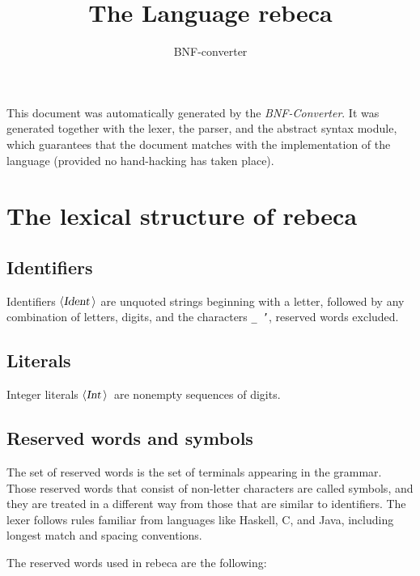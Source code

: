 \documentclass[a4paper,11pt]{article}
\author{BNF-converter}
\title{The Language rebeca}
\begin{document}
\maketitle

\newcommand{\emptyP}{\mbox{$\epsilon$}}
\newcommand{\terminal}[1]{\mbox{{\texttt {#1}}}}
\newcommand{\nonterminal}[1]{\mbox{$\langle \mbox{{\sl #1 }} \! \rangle$}}
\newcommand{\arrow}{\mbox{::=}}
\newcommand{\delimit}{\mbox{$|$}}
\newcommand{\reserved}[1]{\mbox{{\texttt {#1}}}}
\newcommand{\literal}[1]{\mbox{{\texttt {#1}}}}
\newcommand{\symb}[1]{\mbox{{\texttt {#1}}}}

This document was automatically generated by the {\em BNF-Converter}. It was generated together with the lexer, the parser, and the abstract syntax module, which guarantees that the document matches with the implementation of the language (provided no hand-hacking has taken place).

\section*{The lexical structure of rebeca}
\subsection*{Identifiers}
Identifiers \nonterminal{Ident} are unquoted strings beginning with a letter,
followed by any combination of letters, digits, and the characters {\tt \_ '},
reserved words excluded.


\subsection*{Literals}
Integer literals \nonterminal{Int}\ are nonempty sequences of digits.




\subsection*{Reserved words and symbols}
The set of reserved words is the set of terminals appearing in the grammar. Those reserved words that consist of non-letter characters are called symbols, and they are treated in a different way from those that are similar to identifiers. The lexer follows rules familiar from languages like Haskell, C, and Java, including longest match and spacing conventions.

The reserved words used in rebeca are the following: \\
\end{document}
